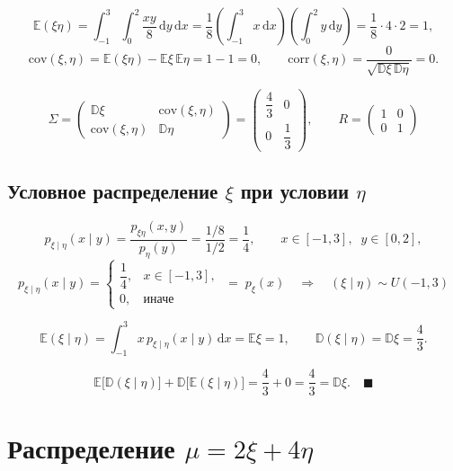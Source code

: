 \documentclass[12pt]{article}
\begin{document}
\[
    \mathbb{E}(\xi\eta) = \int_{-1}^{3}\!\!\int_{0}^{2} \frac{xy}{8}\,\mathrm{d}y\,\mathrm{d}x
    = \frac{1}{8}\left(\int_{-1}^{3} x\,\mathrm{d}x\right)\!\left(\int_{0}^{2} y\,\mathrm{d}y\right)
    = \frac{1}{8}\cdot 4 \cdot 2 = 1,
\]
\[
    \mathrm{cov}(\xi,\eta) = \mathbb{E}(\xi\eta) - \mathbb{E}\xi\,\mathbb{E}\eta = 1 - 1 = 0,
    \qquad
    \mathrm{corr}(\xi,\eta) = \frac{0}{\sqrt{\mathbb{D}\xi\,\mathbb{D}\eta}} = 0.
\]

\[
    \boxed{\;
    \Sigma =
    \begin{pmatrix}
        \mathbb{D}\xi & \mathrm{cov}(\xi,\eta) \\
        \mathrm{cov}(\xi,\eta) & \mathbb{D}\eta
    \end{pmatrix}
    =
    \begin{pmatrix}
        \dfrac{4}{3} & 0 \\[1.5ex]
        0 & \dfrac{1}{3}
    \end{pmatrix},
    \qquad
    R = \begin{pmatrix} 1 & 0 \\ 0 & 1 \end{pmatrix}
    \;}
\]

\subsection{Условное распределение $\xi$ при условии $\eta$}

\[
    p_{\xi\mid\eta}(x \mid y) = \frac{p_{\xi\eta}(x,y)}{p_\eta(y)} = \frac{1/8}{1/2} = \frac{1}{4},
    \qquad x \in [-1,3], \;\; y \in [0,2],
\]
\[
    \boxed{\;
    p_{\xi\mid\eta}(x \mid y) =
    \begin{cases}
        \dfrac{1}{4}, & x \in [-1,3], \\[2ex]
        0, & \text{иначе}
    \end{cases}
    \;=\; p_\xi(x)
    \quad\Longrightarrow\quad (\xi \mid \eta) \sim U(-1,3)
    \;}
\]

\[
    \mathbb{E}(\xi \mid \eta) = \int_{-1}^{3} x\,p_{\xi\mid\eta}(x \mid y)\,\mathrm{d}x = \mathbb{E}\xi = 1,
    \qquad
    \mathbb{D}(\xi \mid \eta) = \mathbb{D}\xi = \frac{4}{3}.
\]

\[
    \mathbb{E}\big[\mathbb{D}(\xi \mid \eta)\big] + \mathbb{D}\big[\mathbb{E}(\xi \mid \eta)\big]
    = \frac{4}{3} + 0 = \frac{4}{3} = \mathbb{D}\xi. \quad\blacksquare
\]

\section{Распределение $\mu = 2\xi + 4\eta$}
\end{document}

